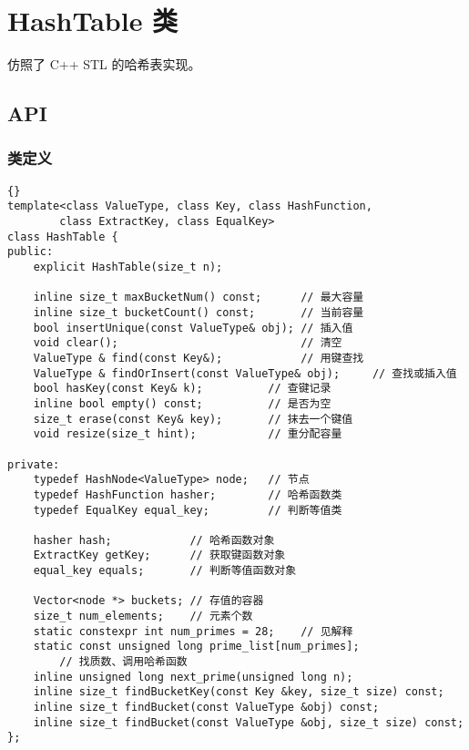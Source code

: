 \chapter{HashTable 类}

仿照了 C++ STL 的哈希表实现。

\section{API}

\subsection{类定义}
{
\begin{lstlisting}[firstnumber=283, caption=HashTable 类定义]{}
template<class ValueType, class Key, class HashFunction,
        class ExtractKey, class EqualKey>
class HashTable {
public:
    explicit HashTable(size_t n);

    inline size_t maxBucketNum() const;      // 最大容量
    inline size_t bucketCount() const;       // 当前容量
    bool insertUnique(const ValueType& obj); // 插入值
    void clear();                            // 清空
    ValueType & find(const Key&);            // 用键查找
    ValueType & findOrInsert(const ValueType& obj);     // 查找或插入值
    bool hasKey(const Key& k);          // 查键记录
    inline bool empty() const;          // 是否为空
    size_t erase(const Key& key);       // 抹去一个键值
    void resize(size_t hint);           // 重分配容量

private:
    typedef HashNode<ValueType> node;   // 节点
    typedef HashFunction hasher;        // 哈希函数类
    typedef EqualKey equal_key;         // 判断等值类

    hasher hash;            // 哈希函数对象
    ExtractKey getKey;      // 获取键函数对象
    equal_key equals;       // 判断等值函数对象

    Vector<node *> buckets; // 存值的容器
    size_t num_elements;    // 元素个数
    static constexpr int num_primes = 28;    // 见解释
    static const unsigned long prime_list[num_primes];
        // 找质数、调用哈希函数
    inline unsigned long next_prime(unsigned long n);
    inline size_t findBucketKey(const Key &key, size_t size) const;
    inline size_t findBucket(const ValueType &obj) const;
    inline size_t findBucket(const ValueType &obj, size_t size) const;
};
\end{lstlisting}


}
